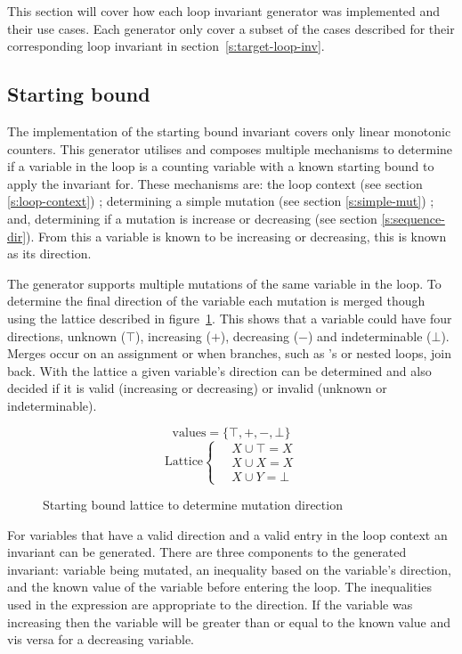 This section will cover how each loop invariant generator was implemented and their use cases.
Each generator only cover a subset of the cases described 
for their corresponding loop invariant in section~\ref{s:target-loop-inv}.

\subsection{Starting bound}

The implementation of the starting bound invariant covers only linear monotonic counters.
This generator utilises and composes multiple mechanisms to determine 
if a variable in the
loop is a counting variable with a known starting bound to apply the invariant for.
These mechanisms are: the loop context (see section \ref{s:loop-context}) ;
determining a simple mutation (see section \ref{s:simple-mut}) ; and,
determining if a mutation is increase or decreasing (see section \ref{s:sequence-dir}).
From this a variable is known to be increasing or decreasing, this is known as its direction.

The generator supports multiple mutations of the same variable in the loop.
To determine the final direction of the variable each mutation is merged though
using the lattice described in figure~\ref{eq:start-lattice}.
This shows that a variable could have four directions, unknown ($\top$),
increasing ($+$), decreasing ($-$) and indeterminable ($\bot$).
Merges occur on an assignment or when branches, 
such as 's or nested loops, join back.
With the lattice a given variable's direction can be determined and also
decided if it is valid (increasing or decreasing) or invalid (unknown or indeterminable).

\begin{figure}
$$\text{values} = \{ \top, +, -, \bot \}$$
\[
\text{Lattice} \begin{cases*}
\quad X \cup \top = X \\
\quad X \cup X = X \\
\quad X \cup Y = \bot
\end{cases*}
\]
\caption{Starting bound lattice to determine mutation direction}
\label{eq:start-lattice}
\end{figure}

For variables that have a valid direction and a valid entry in the loop context an invariant
can be generated.
There are three components to the generated invariant: variable being mutated, an inequality based
on the variable's direction, and the known value of the variable before entering the loop.
The inequalities used in the expression are appropriate to the direction. 
If the variable was increasing then the variable will be greater than or equal to the known value
and vis versa for a decreasing variable.

